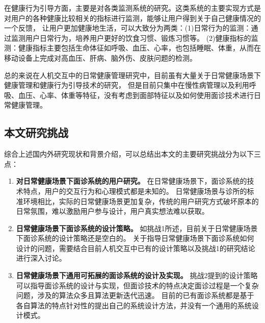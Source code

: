 在健康行为引导方面，主要是对各类监测系统的研究。这类系统的主要实现方式是对用户的各种健康比较相关的指标进行监测，能够让用户得到关于自己健康情况的一个反馈，
让用户更加健康地生活，可以大致分为两类：(1)日常行为的监测：通过监测用户日常行为，培养用户更好的饮食习惯、锻炼习惯等\cite{purpura2011fit4life, Inagawa2013A,bravata2007using,cordeiro2015barriers,lin2006fish, miller2014stepstream}。 
(2)健康指标的监测：健康指标主要包括生命体征如呼吸、血压、心率，也包括睡眠、体重，从而在移动设备上完成对高血压、肝病、脑外伤、皮肤问题的检测\cite{liang2020oralcam, wang2018seismo, mariakakis2017biliscreen}。

总的来说在人机交互中的日常健康管理研究中，目前虽有大量关于日常健康场景下健康管理和健康行为引导技术的研究，
但是目前只集中在慢性病管理以及利用呼吸、血压、心率、体重等特征，没有考虑到面部特征以及如何使用面诊技术进行日常健康管理。



\subsection{本文研究挑战}
综合上述国内外研究现状和背景介绍，可以总结出本文的主要研究挑战分为以下三点：
\begin{enumerate}
    \item \textbf{对日常健康场景下面诊系统的用户研究。}
    在日常健康场景下，面诊系统的技术特点，用户的交互行为和心理模式都是未知的。
    日常健康场景与诊所的标准环境相比，实际的日常健康场景更加复杂，传统的用户研究方式破坏原本的日常氛围，难以激励用户参与设计，用户真实想法难以获取。

\item \textbf{日常健康场景下面诊系统的设计策略。}
    如挑战1所述，目前关于日常健康场景下面诊系统的设计策略还是空白的。
    关于指导日常健康场景下面诊系统如何设计的问题，需要结合目前人机交互中已有的设计策略以及挑战1的研究结论进行深入讨论。

\item \textbf{日常健康场景下通用可拓展的面诊系统的设计及实现。}
    挑战2提到的设计策略可以指导面诊系统的设计与实现，但面诊技术的特点决定面诊过程是一个复杂问题，涉及的算法众多且算法更新迭代迅速。
    目前的已有面诊系统都是基于各自算法的特点针对性的提出自己的系统设计方法，并没有一个通用的系统设计模式。
    
\end{enumerate}
